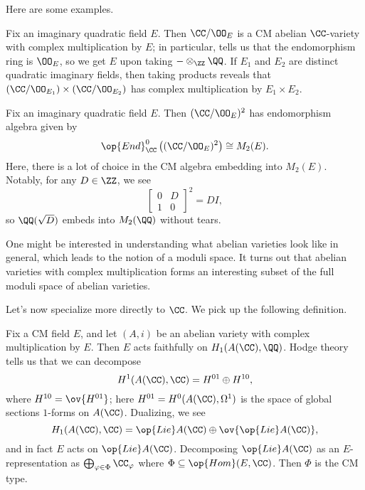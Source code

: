 \documentclass[../notes.tex]{subfiles}
\begin{document}
Here are some examples.
\begin{example}
	Fix an imaginary quadratic field $E$. Then $\CC/\OO_E$ is a CM abelian $\CC$-variety with complex multiplication by $E$; in particular,  tells us that the endomorphism ring is $\OO_E$, so we get $E$ upon taking $-\otimes_\ZZ\QQ$. If $E_1$ and $E_2$ are distinct quadratic imaginary fields, then taking products reveals that $(\CC/\OO_{E_1})\times(\CC/\OO_{E_2})$ has complex multiplication by $E_1\times E_2$.
\end{example}
\begin{example}
	Fix an imaginary quadratic field $E$. Then $(\CC/\OO_E)^2$ has endomorphism algebra given by
	\[\op{End}^0_\CC\left((\CC/\OO_E)^2\right)\cong M_2(E).\]
	Here, there is a lot of choice in the CM algebra embedding into $M_2(E)$. Notably, for any $D\in\ZZ$, we see
	\[\begin{bmatrix}
		0 & D \\
		1 & 0
	\end{bmatrix}^2=DI,\]
	so $\QQ(\sqrt D)$ embeds into $M_2(\QQ)$ without tears.
\end{example}
\begin{remark}
	One might be interested in understanding what abelian varieties look like in general, which leads to the notion of a moduli space. It turns out that abelian varieties with complex multiplication forms an interesting subset of the full moduli space of abelian varieties.
\end{remark}
Let's now specialize more directly to $\CC$. We pick up the following definition.
\begin{definition}[CM type]
	Fix a CM field $E$, and let $(A,i)$ be an abelian variety with complex multiplication by $E$. Then $E$ acts faithfully on $H_1(A(\CC),\QQ)$. Hodge theory tells us that we can decompose
	\[H^1(A(\CC),\CC)=H^{01}\oplus H^{10},\]
	where $H^{10}=\ov{H^{01}}$; here $H^{01}=H^0(A(\CC),\Omega^1)$ is the space of global sections $1$-forms on $A(\CC)$. Dualizing, we see
	\[H_1(A(\CC),\CC)=\op{Lie}A(\CC)\oplus\ov{\op{Lie}A(\CC)},\]
	and in fact $E$ acts on $\op{Lie}A(\CC)$. Decomposing $\op{Lie}A(\CC)$ as an $E$-representation as $\bigoplus_{\varphi\in\Phi}\CC_\varphi$ where $\Phi\subseteq\op{Hom}(E,\CC)$. Then $\Phi$ is the CM type.
\end{definition}
\end{document}
